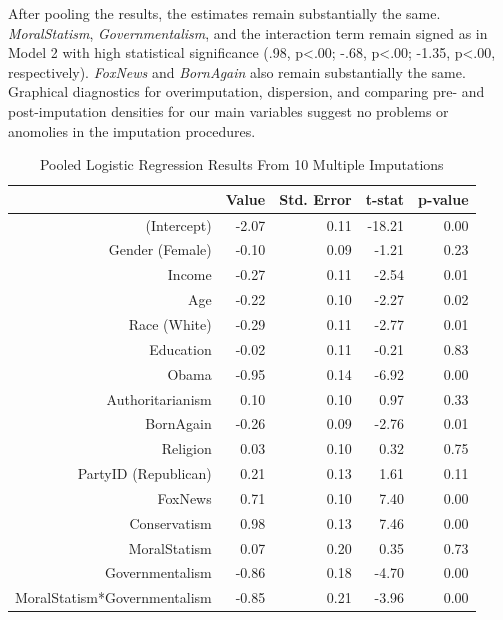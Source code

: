 \documentclass[12pt,]{article}
\begin{document}
After pooling the results, the estimates remain substantially the same.
\emph{MoralStatism}, \emph{Governmentalism}, and the interaction term
remain signed as in Model 2 with high statistical significance (.98,
p\textless{}.00; -.68, p\textless{}.00; -1.35, p\textless{}.00,
respectively). \emph{FoxNews} and \emph{BornAgain} also remain
substantially the same. Graphical diagnostics for overimputation,
dispersion, and comparing pre- and post-imputation densities for our
main variables suggest no problems or anomolies in the imputation
procedures. \clearpage

\begin{table}[ht]
\centering
\begin{tabular}{rrrrr}
  \hline
 & Value & Std. Error & t-stat & p-value \\ 
  \hline
(Intercept) & -2.07 & 0.11 & -18.21 & 0.00 \\ 
  Gender (Female) & -0.10 & 0.09 & -1.21 & 0.23 \\ 
  Income & -0.27 & 0.11 & -2.54 & 0.01 \\ 
  Age & -0.22 & 0.10 & -2.27 & 0.02 \\ 
  Race (White) & -0.29 & 0.11 & -2.77 & 0.01 \\ 
  Education & -0.02 & 0.11 & -0.21 & 0.83 \\ 
  Obama & -0.95 & 0.14 & -6.92 & 0.00 \\ 
  Authoritarianism & 0.10 & 0.10 & 0.97 & 0.33 \\ 
  BornAgain & -0.26 & 0.09 & -2.76 & 0.01 \\ 
  Religion & 0.03 & 0.10 & 0.32 & 0.75 \\ 
  PartyID (Republican) & 0.21 & 0.13 & 1.61 & 0.11 \\ 
  FoxNews & 0.71 & 0.10 & 7.40 & 0.00 \\ 
  Conservatism & 0.98 & 0.13 & 7.46 & 0.00 \\ 
  MoralStatism & 0.07 & 0.20 & 0.35 & 0.73 \\ 
  Governmentalism & -0.86 & 0.18 & -4.70 & 0.00 \\ 
  MoralStatism*Governmentalism & -0.85 & 0.21 & -3.96 & 0.00 \\ 
   \hline
\end{tabular}
\caption{Pooled Logistic Regression Results From 10 Multiple Imputations} 
\end{table}

\clearpage
\end{document}
